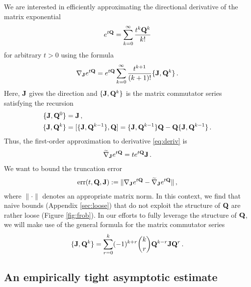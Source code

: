 \documentclass[12pt]{article} %
\begin{document}
 We are interested in efficiently approximating the directional derivative of the matrix exponential
\begin{align*}
	e^{t\mathbf{Q}} = \sum_{k=0}^\infty \frac{t^k\mathbf{Q}^k}{k!}
\end{align*}
for arbitrary $t>0$ using the formula \citep{najfeld1995derivatives}
\begin{align}\label{eq:deriv}
	\nabla_{\mathbf{J}} e^{t\mathbf{Q}}  =  e^{t\mathbf{Q}}  \sum_{k=0}^\infty \frac{t^{k+1}}{(k+1)!} \{\mathbf{J},\mathbf{Q}^k\} \, .
\end{align}
Here, $\mathbf{J}$ gives the direction and $\{\mathbf{J},\mathbf{Q}^k\}$ is the matrix commutator series satisfying the recursion
\begin{align*}
	\{\mathbf{J},\mathbf{Q}^0\} &= \mathbf{J} \, , \\ 
	\{\mathbf{J},\mathbf{Q}^k\} &= [\{\mathbf{J},\mathbf{Q}^{k-1}\} , \mathbf{Q}]  = \{\mathbf{J},\mathbf{Q}^{k-1}\} \mathbf{Q} - \mathbf{Q} \{\mathbf{J},\mathbf{Q}^{k-1}\} \, .
\end{align*}
Thus, the first-order approximation to derivative \eqref{eq:deriv} is 
\begin{align}\label{eq:firstOrder}
	\widetilde{\nabla}_{\mathbf{J}} e^{t\mathbf{Q}}= t e^{t\mathbf{Q}}\mathbf{J} \, .
\end{align}
We want to bound the truncation error
\begin{align*}
\mbox{err}(t,\mathbf{Q},\mathbf{J})	:=\lVert \nabla_{\mathbf{J}} e^{t\mathbf{Q}} - \widetilde{\nabla}_{\mathbf{J}} e^{t\mathbf{Q}} \rVert \, ,
\end{align*}
 where $\lVert \cdot \rVert$ denotes an appropriate matrix norm.  In this context, we find that naive bounds (Appendix \ref{sec:loose}) that do not exploit the structure of $\mathbf{Q}$  are rather loose (Figure \ref{fig:frob}).  
 In our efforts to fully leverage the structure of $\mathbf{Q}$, we will make use of the general formula for the matrix commutator series  \citep{volkin1968iterated}
\begin{align}\label{eq:commSeries}
	\{ \mathbf{J}, \mathbf{Q}^k\} = \sum_{r=0}^k (-1)^{k+r}  {k \choose r} \mathbf{Q}^{k-r} \mathbf{J} \mathbf{Q}^r  \, .
\end{align}

\subsection{An empirically tight asymptotic estimate}
\end{document}
